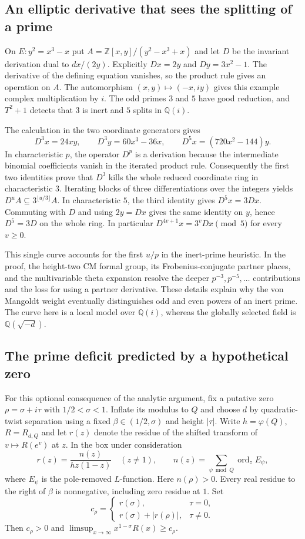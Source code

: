 \subsection{An elliptic derivative that sees the splitting of a prime}

On $E:y^2=x^3-x$ put $A=\mathbb Z[x,y]/(y^2-x^3+x)$ and let $D$ be the invariant derivation dual to $dx/(2y)$. Explicitly $Dx=2y$ and $Dy=3x^2-1$. The derivative of the defining equation vanishes, so the product rule gives an operation on $A$. The automorphism $(x,y)\mapsto(-x,iy)$ gives this example complex multiplication by $i$. The odd primes $3$ and $5$ have good reduction, and $T^2+1$ detects that $3$ is inert and $5$ splits in $\mathbb Q(i)$.

The calculation in the two coordinate generators gives
\[
 D^3x=24xy,\qquad D^3y=60x^3-36x,\qquad
 D^5x=(720x^2-144)y.
\]
In characteristic $p$, the operator $D^p$ is a derivation because the intermediate binomial coefficients vanish in the iterated product rule. Consequently the first two identities prove that $D^3$ kills the whole reduced coordinate ring in characteristic $3$. Iterating blocks of three differentiations over the integers yields $D^u A\subseteq 3^{\lfloor u/3\rfloor}A$. In characteristic $5$, the third identity gives $D^5 x=3Dx$. Commuting with $D$ and using $2y=Dx$ gives the same identity on $y$, hence $D^5=3D$ on the whole ring. In particular $D^{4v+1}x=3^v Dx\pmod5$ for every $v\ge0$.

This single curve accounts for the first $u/p$ in the inert-prime heuristic. In the proof, the height-two CM formal group, its Frobenius-conjugate partner places, and the multivariable theta expansion resolve the deeper $p^{-3},p^{-5},\ldots$ contributions and the loss for using a partner derivative. These details explain why the von Mangoldt weight eventually distinguishes odd and even powers of an inert prime. The curve here is a local model over $\mathbb Q(i)$, whereas the globally selected field is $\mathbb Q(\sqrt{-d})$.

\subsection{The prime deficit predicted by a hypothetical zero}

For this optional consequence of the analytic argument, fix a putative zero $\rho=\sigma+i\tau$ with $1/2<\sigma<1$. Inflate its modulus to $Q$ and choose $d$ by quadratic-twist separation using a fixed $\beta\in(1/2,\sigma)$ and height $|\tau|$. Write $h=\varphi(Q)$, $R=R_{d,Q}$ and let $r(z)$ denote the residue of the shifted transform of $v\mapsto R(e^v)$ at $z$. In the box under consideration
\[
 r(z)=\frac{n(z)}{h z(1-z)}\quad(z\ne1),
 \qquad n(z)=\sum_{\psi\bmod Q}\operatorname{ord}_{z} E_\psi ,
\]
where $E_\psi$ is the pole-removed $L$-function. Here $n(\rho)>0$. Every real residue to the right of $\beta$ is nonnegative, including zero residue at $1$. Set
\[
 c_\rho=
 \begin{cases}
 r(\sigma),&\tau=0,\\
 r(\sigma)+|r(\rho)|,&\tau\ne0 .
 \end{cases}
\]
Then $c_\rho>0$ and $\limsup_{x\to\infty} x^{1-\sigma}R(x)\ge c_\rho$.

